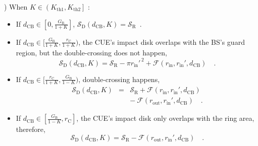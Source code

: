 \documentclass[journal, 10pt]{IEEEtran}
\begin{document}
) When $K \in \left( K_\mathrm{th1},  K_\mathrm{th2}\right]$ :
\begin{itemize}
\item If $d_\mathrm{CB} \in [0, \frac{G_\mathrm{B}}{1+K}]$,  
$\mathcal{S}_{\mathrm{D}}\left(d_\mathrm{CB}, K\right) = \mathcal{S}_{\mathrm{R}}$~.
\item If $d_\mathrm{CB} \in [\frac{G_\mathrm{B}}{1+K}, \frac{r_\mathrm{C}}{1+K})$, 
the CUE's impact disk overlaps with the BS's guard region, but the 
double-crossing does not happen, 
\setlength{\arraycolsep}{0.0em}
\begin{equation}
\mathcal{S}_{\mathrm{D}}\left(d_\mathrm{CB}, K\right)  =  
\mathcal{S}_{\mathrm{R}} - \pi r_\mathrm{in}'^{\,2} + \mathcal{F}\left(r_\mathrm{in}, 
r_\mathrm{in}', d_\mathrm{CB}\right)\quad.
\end{equation}
\setlength{\arraycolsep}{5pt}
\item If $d_\mathrm{CB} \in [\frac{r_\mathrm{C}}{1+K},  
\frac{G_\mathrm{B}}{1-K})$, double-crossing happens,
\setlength{\arraycolsep}{0.0em}
\begin{eqnarray}
\mathcal{S}_{\mathrm{D}}\left(d_\mathrm{CB}, K\right) &{}={}&  
\mathcal{S}_{\mathrm{R}} + \mathcal{F}\left(r_\mathrm{in}, r_\mathrm{in}', 
d_\mathrm{CB}\right) \nonumber\\
&&{-}\:  \mathcal{F}\left(r_\mathrm{out}, r_\mathrm{in}', d_\mathrm{CB}
\right)\quad.
\end{eqnarray}
\setlength{\arraycolsep}{5pt}
\item  If $d_\mathrm{CB} \in [\frac{G_\mathrm{B}}{1-K}, r_\mathrm{C}]$, 
the CUE's impact disk only overlaps with the ring area, therefore,
\begin{equation}
\mathcal{S}_{\mathrm{D}}\left(d_\mathrm{CB}, K\right)  =  
\mathcal{S}_{\mathrm{R}}  - \mathcal{F}\left(r_\mathrm{out}, r_\mathrm{in}', 
d_\mathrm{CB}\right)\quad.
\end{equation}
\end{itemize}
\end{document}
